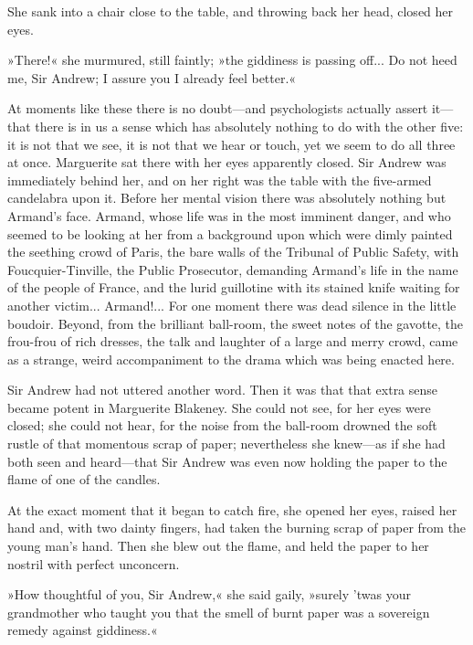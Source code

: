 She sank into a chair close to the table, and throwing back her head, closed her eyes.

»There!« she murmured, still faintly; »the giddiness is passing off... Do not heed me, Sir Andrew; I assure you I already feel better.«

At moments like these there is no doubt\allowbreak---\allowbreak and psychologists actually assert it\allowbreak---\allowbreak that there is in us a sense which has absolutely nothing to do with the other five: it is not that we see, it is not that we hear or touch, yet we seem to do all three at once. Marguerite sat there with her eyes apparently closed. Sir Andrew was immediately behind her, and on her right was the table with the five-armed candelabra upon it. Before her mental vision there was absolutely nothing but Armand's face. Armand, whose life was in the most imminent danger, and who seemed to be looking at her from a background upon which were dimly painted the seething crowd of Paris, the bare walls of the Tribunal of Public Safety, with Foucquier-Tinville, the Public Prosecutor, demanding Armand's life in the name of the people of France, and the lurid guillotine with its stained knife waiting for another victim... Armand!... For one moment there was dead silence in the little boudoir. Beyond, from the brilliant ball-room, the sweet notes of the gavotte, the frou-frou of rich dresses, the talk and laughter of a large and merry crowd, came as a strange, weird accompaniment to the drama which was being enacted here.

Sir Andrew had not uttered another word. Then it was that that extra sense became potent in Marguerite Blakeney. She could not see, for her eyes were closed; she could not hear, for the noise from the ball-room drowned the soft rustle of that momentous scrap of paper; nevertheless she knew\allowbreak---\allowbreak as if she had both seen and heard\allowbreak---\allowbreak that Sir Andrew was even now holding the paper to the flame of one of the candles.

At the exact moment that it began to catch fire, she opened her eyes, raised her hand and, with two dainty fingers, had taken the burning scrap of paper from the young man's hand. Then she blew out the flame, and held the paper to her nostril with perfect unconcern.

»How thoughtful of you, Sir Andrew,« she said gaily, »surely 'twas your grandmother who taught you that the smell of burnt paper was a sovereign remedy against giddiness.«

